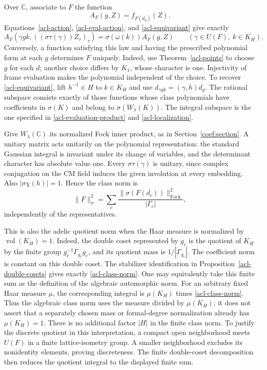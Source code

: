 Over $\mathbb C$, associate to $F$ the function
\[
                              A_F(g,Z)=f_{F(d_g)}(Z).
\]
Equations~\eqref{acl-action}, \eqref{acl-eval-action}, and
\eqref{acl-equivariant} give exactly
\begin{equation}\label{acl-adelic-law}
 A_F(\gamma gk,((\sigma\tau(\gamma))Z_\tau)_\tau)
                           =\sigma(\omega(k))A_F(g,Z)
 \qquad(\gamma\in U(F),\ k\in K_H).
\end{equation}
Conversely, a function satisfying this law and having the prescribed
polynomial form at each $g$ determines $F$ uniquely.
Indeed, use Theorem~\ref{acl-points} to choose $g$ for each $d$;
another choice differs by $K_1$, whose character is one.
Injectivity of frame evaluation makes the polynomial independent
of the choice. To recover \eqref{acl-equivariant}, lift
$h^{-1}\in H$ to $k\in K_H$ and use
$d_{\gamma gk}=(\gamma,h)d_g$.
The rational subspace consists exactly of those functions whose
class polynomials have coefficients in $\sigma(K)$ and belong
to $\sigma(W_\lambda(K))$. The integral subspace is the one
specified in \eqref{acl-evaluation-product} and
\eqref{acl-localization}.

Give $W_\lambda(\mathbb C)$ its normalized Fock inner product,
as in Section~\ref{coef:section}. A unitary matrix acts
unitarily on the polynomial representation: the standard Gaussian
integral is invariant under its change of variables, and the
determinant character has absolute value one.
Every $\sigma\tau(\gamma)$ is unitary, since complex conjugation
on the CM field induces the given involution at every embedding.
Also $|\sigma\chi(h)|=1$. Hence the class norm is
\begin{equation}\label{acl-class-norm}
                  \|F\|_\sigma^2
                     =\sum_c\frac{\|\sigma(F(d_c))\|_{\mathrm{Fock}}^2}
                                             {|\Gamma_c|},
\end{equation}
independently of the representatives.

This is also the adelic quotient norm when the Haar measure is
normalized by $\operatorname{vol}(K_H)=1$. Indeed, the
double coset represented by $g_c$ is the quotient of $K_H$
by the finite group $g_c^{-1}\Gamma_{g_c}g_c$, and its quotient
mass is $1/|\Gamma_{g_c}|$. The coefficient norm is constant
on this double coset. The stabilizer identification in
Proposition~\ref{acl-double-cosets} gives exactly
\eqref{acl-class-norm}. One may equivalently take this finite
sum as the definition of the algebraic automorphic norm.
For an arbitrary fixed Haar measure $\mu$, the corresponding
integral is $\mu(K_H)$ times \eqref{acl-class-norm}.
Thus the algebraic class norm uses the measure divided by
$\mu(K_H)$; it does not assert that a separately chosen mass
or formal-degree normalization already has $\mu(K_H)=1$.
There is no additional factor $|H|$ in the finite class norm.
To justify the discrete quotient in this interpretation, a compact
open neighborhood meets $U(F)$ in a finite lattice-isometry group.
A smaller neighborhood excludes its nonidentity elements, proving
discreteness. The finite double-coset decomposition then reduces
the quotient integral to the displayed finite sum.

